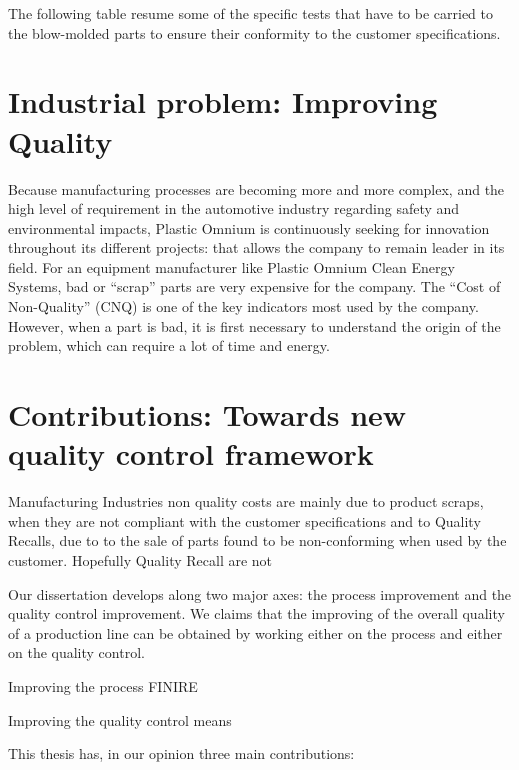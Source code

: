 The following table resume some of the specific tests that have to be carried to the blow-molded parts to ensure their conformity to the customer specifications.


\section{Industrial problem: Improving Quality}

Because manufacturing processes are becoming more and more complex, and the high level of requirement in the automotive industry regarding safety and environmental impacts, Plastic Omnium is continuously seeking for innovation throughout its different projects: that allows the company to remain leader in its field.
For an equipment manufacturer like Plastic Omnium Clean Energy Systems, bad or ``scrap'' parts are very expensive for the company. The “Cost of Non-Quality” (CNQ) is one of the key indicators most used by the company. However, when a part is bad, it is first necessary to understand the origin of the problem, which can require a lot of time and energy.



\section{Contributions: Towards new quality control framework}

Manufacturing Industries non quality costs are mainly due to product scraps, when they are not compliant with the customer specifications and to Quality Recalls, due to to the sale of parts found to be non-conforming when used by the customer. Hopefully Quality Recall are not  %

Our dissertation develops along two major axes: the process improvement and the quality control improvement. We claims that the improving of the overall quality of a production line can be obtained by working either on the process and either on the quality control. 

Improving the process FINIRE

Improving the quality control means 

This thesis has, in our opinion three main contributions:

